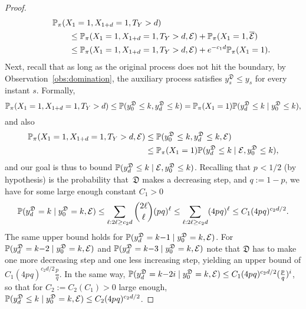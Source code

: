 \begin{proof}
\begin{align*}
    & \P_{\pi}(X_{1}=1, X_{1+d}=1, T_Y
>d) \\ & \qquad \le  \P_{\pi}(X_{1}=1, X_{1+d}=1, T_Y
>d, \mathcal{E}) + \P_{\pi}(X_1=1, \overline{\mathcal{E}}) \\ \qquad
     & \qquad \le \P_{\pi}(X_{1}=1, X_{1+d}=1, T_Y
>d, \mathcal{E}) + e^{-c_1 d}\P_{\pi}(X_1=1).
\end{align*}
 Next, recall that as long as the original process does not hit the boundary, by Observation~\ref{obs:domination}, the auxiliary process satisfies $y_s^{\mathfrak{D}} \le y_s$ for every instant $s$. Formally,
$$ \P_{\pi}(X_{1}=1, X_{1+d}=1, T_Y
>d) \le \P(\auxy_0^{\mathfrak{D}} \le k, \auxy_{d}^{\mathfrak{D}} \le k)=\P_{\pi}(X_1=1)\P(\auxy_d^{\mathfrak{D}} \le k \mid \auxy_0^{\mathfrak{D}} \le k),   
$$
and also 
\begin{align*}
\P_{\pi}(X_{1}=1, X_{1+d}=1, T_Y
>d, \mathcal{E}) &\le
\P(\auxy_0^{\mathfrak{D}} \le k, \auxy_{d}^{\mathfrak{D}} \le k, \mathcal{E}) \\
& \le 
\P_{\pi}(X_1=1)\P(\auxy_d^{\mathfrak{D}} \le k \mid \mathcal{E}, \auxy_0^{\mathfrak{D}} \le k),
\end{align*}
and our goal is thus to bound $\P(\auxy_d^{\mathfrak{D}} \le k \mid \mathcal{E}, \auxy_0^{\mathfrak{D}} \le k)$.
Recalling that $p_{} < 1/2$ (by hypothesis) is the probability that~$\mathfrak{D}$ makes a decreasing step, and $q:=1-p$, we have for some large enough constant $C_1 > 0$ %
$$
 \P(\auxy_{d}^{\mathfrak{D}} = k \mid \auxy_0^{\mathfrak{D}}=k, \mathcal{E}) \le \sum_{\ell: 2\ell \ge c_2 d} \binom{2\ell}{\ell}(p_{}q)^{\ell}\le \sum_{\ell:2\ell \ge c_2 d} (4p_{}q)^{\ell} \le C_1(4p_{}q)^{c_2 d/2}.
$$
The same upper bound holds for  $\P(\auxy_{d}^{\mathfrak{D}} = k{-}1 \mid \auxy_0^{\mathfrak{D}}=k, \mathcal{E})$. For  $\P(\auxy_{d}^{\mathfrak{D}} = k{-}2 \mid \auxy_0^{\mathfrak{D}}=k, \mathcal{E})$ and  $\P(\auxy_{d}^{\mathfrak{D}} = k{-}3 \mid \auxy_0^{\mathfrak{D}}=k, \mathcal{E})$ note that $\mathfrak{D}$ has to make one more decreasing step and one less increasing step, yielding an upper bound of 
$C_1(4p_{}q)^{c_2 d/2} \frac{p_{}}{q}$. In the same way, 
$\P(\auxy_{d}^{\mathfrak{D}} = k{-}2i \mid \auxy_0^{\mathfrak{D}}=k, \mathcal{E}) \le  C_1(4p_{}q)^{c_2 d/2} (\frac{p_{}}{q})^i$, so that for $C_2:=C_2(C_1) > 0$ large enough,
$\P(\auxy_{d}^{\mathfrak{D}} \le k \mid \auxy_0^{\mathfrak{D}}=k, \mathcal{E}) \le C_2 (4p_{}q)^{c_2 d/2}$.

\end{proof}
